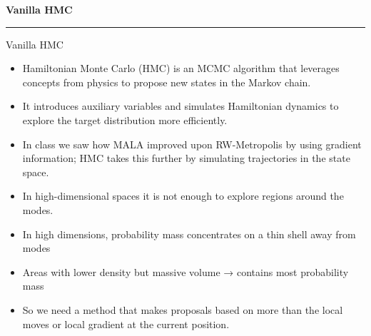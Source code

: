 \begin{frame}
	\vspace{2cm}
	\begin{center}
		{\Huge\textbf{\textcolor{copenhagenred}{Vanilla HMC}}}
		\vspace{1cm}

		\rule{4cm}{3pt}
		\vspace{2cm}
	\end{center}
\end{frame}

\begin{frame}{Vanilla HMC}
	\begin{itemize}
		\item Hamiltonian Monte Carlo (HMC) is an MCMC algorithm that leverages concepts from physics to propose new states in the Markov chain.
		\item It introduces auxiliary variables and simulates Hamiltonian dynamics to explore the target distribution more efficiently.
		\item In class we saw how MALA improved upon RW-Metropolis by using gradient information; HMC takes this further by simulating trajectories in the state space.
		\item In high-dimensional spaces it is not enough to explore regions around the modes.
		\item In high dimensions, probability mass concentrates on a thin shell away from modes
		\item Areas with lower density but massive volume → contains most probability mass
		\item So we need a method that makes proposals based on more than the local moves or local gradient at the current position.
	\end{itemize}
\end{frame}

